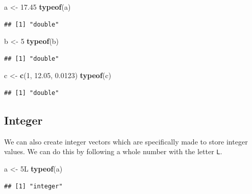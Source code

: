 \documentclass[
]{book}
\newenvironment{Shaded}{\begin{snugshade}}{\end{snugshade}}
\newcommand{\DecValTok}[1]{\textcolor[rgb]{0.00,0.00,0.81}{#1}}
\newcommand{\FloatTok}[1]{\textcolor[rgb]{0.00,0.00,0.81}{#1}}
\newcommand{\KeywordTok}[1]{\textcolor[rgb]{0.13,0.29,0.53}{\textbf{#1}}}
\newcommand{\NormalTok}[1]{#1}
\newcommand{\StringTok}[1]{\textcolor[rgb]{0.31,0.60,0.02}{#1}}
\begin{document}
\begin{Shaded}
\begin{Highlighting}[]
\NormalTok{a <-}\StringTok{ }\FloatTok{17.45}
\KeywordTok{typeof}\NormalTok{(a)}
\end{Highlighting}
\end{Shaded}

\begin{verbatim}
## [1] "double"
\end{verbatim}

\begin{Shaded}
\begin{Highlighting}[]
\NormalTok{b <-}\StringTok{ }\DecValTok{5}
\KeywordTok{typeof}\NormalTok{(b)}
\end{Highlighting}
\end{Shaded}

\begin{verbatim}
## [1] "double"
\end{verbatim}

\begin{Shaded}
\begin{Highlighting}[]
\NormalTok{c <-}\StringTok{ }\KeywordTok{c}\NormalTok{(}\DecValTok{1}\NormalTok{, }\FloatTok{12.05}\NormalTok{, }\FloatTok{0.0123}\NormalTok{)}
\KeywordTok{typeof}\NormalTok{(c)}
\end{Highlighting}
\end{Shaded}

\begin{verbatim}
## [1] "double"
\end{verbatim}

\hypertarget{integer}{%
\subsection*{Integer}\label{integer}}

We can also create integer vectors which are specifically made to store integer values. We can do this by following a whole number with the letter \texttt{L}.

\begin{Shaded}
\begin{Highlighting}[]
\NormalTok{a <-}\StringTok{ }\NormalTok{5L}
\KeywordTok{typeof}\NormalTok{(a)}
\end{Highlighting}
\end{Shaded}

\begin{verbatim}
## [1] "integer"
\end{verbatim}
\end{document}

